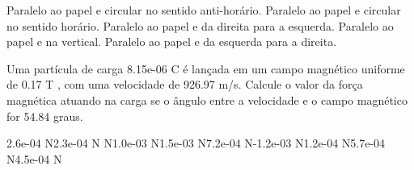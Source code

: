\documentclass[12pt, addpoints]{exam}
\begin{document}
\begin{questions}
\begin{multicols*}{2}
\begin{choices}
\choice Paralelo ao papel e circular no sentido anti-horário. 
\choice Paralelo ao papel e circular no sentido horário. 
\choice Paralelo ao papel e da direita para a esquerda. 
\choice Paralelo ao papel e na vertical. 
\choice Paralelo ao papel e da esquerda para a direita. 
\end{choices}
\question Uma partícula de carga 8.15e-06 C é lançada em um campo magnético uniforme de    0.17 T , com uma velocidade de 926.97 m/s. Calcule o valor da força magnética atuando na carga se o ângulo entre a velocidade e o campo magnético for   54.84 graus.

\begin{oneparchoices}
\choice 2.6e-04 N\choice 2.3e-04 N N\choice 1.0e-03 N\choice 1.5e-03 N\choice 7.2e-04 N\choice -1.2e-03 N\choice 1.2e-04 N\choice 5.7e-04 N\choice 4.5e-04 N
\end{oneparchoices}\end{multicols*}
\end{questions}
\newpage
\end{document}
